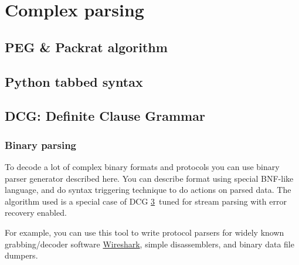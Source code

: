 \part{Complex parsing}

\chapter{PEG \& Packrat algorithm}

\chapter{Python tabbed syntax}

\chapter{DCG: Definite Clause Grammar}\label{DCG}\clearpage

\section{Binary parsing}

To decode a lot of complex binary formats and protocols you can use binary
parser generator described here. You can describe format using special BNF-like
language, and do syntax triggering technique to do actions on parsed data.
The algorithm used is a special case of DCG \ref{DCG}\ tuned for stream parsing
with error recovery enabled.

For example, you can use this tool to write protocol parsers for widely known
grabbing/decoder software \href{http://www.wireshark.org/}{Wireshark}, 
simple disassemblers, and binary data file dumpers.
